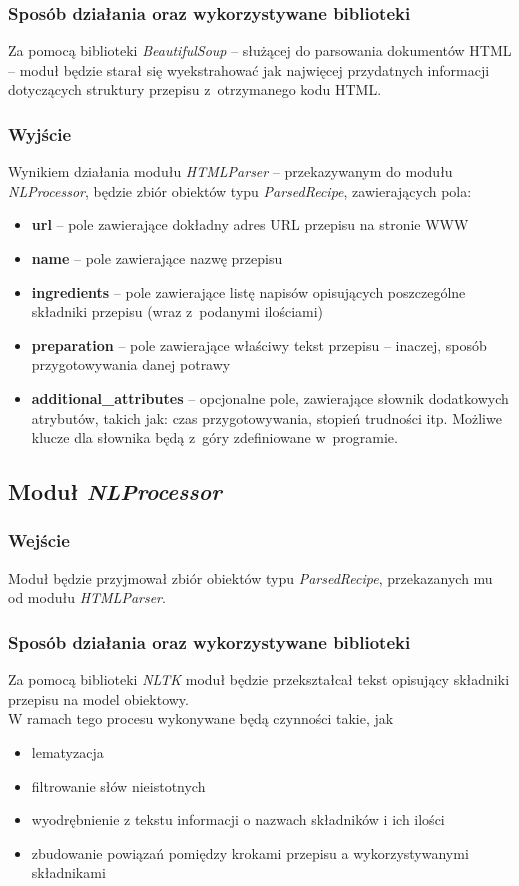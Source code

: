 \documentclass[11pt,a4paper]{article}
\begin{document}
\subsubsection{Sposób działania oraz wykorzystywane biblioteki}
Za pomocą biblioteki \textit{BeautifulSoup} -- służącej do parsowania dokumentów HTML -- moduł będzie starał się wyekstrahować jak najwięcej przydatnych informacji dotyczących struktury przepisu z~otrzymanego kodu HTML.
\subsubsection{Wyjście}
Wynikiem działania modułu \textit{HTMLParser} -- przekazywanym do modułu \textit{NLProcessor}, będzie zbiór obiektów typu \textit{ParsedRecipe}, zawierających pola:
\begin{itemize}
  \item \textbf{url} -- pole zawierające dokładny adres URL przepisu na stronie WWW
  \item \textbf{name} -- pole zawierające nazwę przepisu
  \item \textbf{ingredients} -- pole zawierające listę napisów opisujących poszczególne składniki przepisu (wraz z~podanymi ilościami)
  \item \textbf{preparation} -- pole zawierające właściwy tekst przepisu -- inaczej, sposób przygotowywania danej potrawy
  \item \textbf{additional\_attributes} -- opcjonalne pole, zawierające słownik dodatkowych atrybutów, takich jak: czas przygotowywania, stopień trudności itp. Możliwe klucze dla słownika będą z~góry zdefiniowane w~programie.
\end{itemize}

\newpage
\subsection{Moduł \textit{NLProcessor}}
\subsubsection{Wejście}
Moduł będzie przyjmował zbiór obiektów typu \textit{ParsedRecipe}, przekazanych mu od modułu \textit{HTMLParser}.
\subsubsection{Sposób działania oraz wykorzystywane biblioteki}
Za pomocą biblioteki \textit{NLTK} moduł będzie przekształcał tekst opisujący składniki przepisu na model obiektowy.\\ 
W ramach tego procesu wykonywane będą czynności takie, jak 
\begin{itemize}
	\item lematyzacja 
	\item filtrowanie słów nieistotnych
	\item wyodrębnienie z tekstu informacji o nazwach składników i ich ilości
	\item zbudowanie powiązań pomiędzy krokami przepisu a wykorzystywanymi składnikami
\end{itemize}
\end{document}

